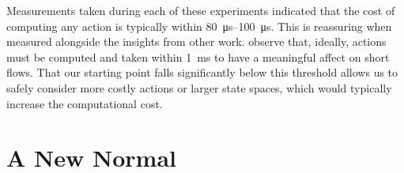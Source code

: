 \documentclass[conference, a4paper, 10pt, times]{IEEEtran}
\begin{document}
Measurements taken during each of these experiments indicated that the cost of computing any action is typically within \SIrange{80}{100}{\micro\second}.
This is reassuring when measured alongside the insights from other work.
\Textcite{DBLP:conf/sigcomm/ChenL0L18} observe that, ideally, actions must be computed and taken within \SI{1}{\milli\second} to have a meaningful affect on short flows.
That our starting point falls significantly below this threshold allows us to safely consider more costly actions or larger state spaces, which would typically increase the computational cost.

%

\section{A New Normal}\label{sec:a-new-normal}

%
\end{document}
